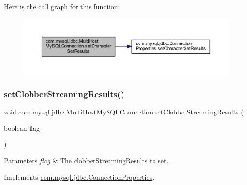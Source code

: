 Here is the call graph for this function\+:
\nopagebreak
\begin{figure}[H]
\begin{center}
\leavevmode
\includegraphics[width=350pt]{classcom_1_1mysql_1_1jdbc_1_1_multi_host_my_s_q_l_connection_a5fa2549fbd789689d65411226fc16101_cgraph}
\end{center}
\end{figure}
\mbox{\label{classcom_1_1mysql_1_1jdbc_1_1_multi_host_my_s_q_l_connection_aaa5a94dd2c2c57150920af50503b9764}} 
\subsubsection{\texorpdfstring{set\+Clobber\+Streaming\+Results()}{setClobberStreamingResults()}}
{\footnotesize\ttfamily void com.\+mysql.\+jdbc.\+Multi\+Host\+My\+S\+Q\+L\+Connection.\+set\+Clobber\+Streaming\+Results (\begin{DoxyParamCaption}\item[{boolean}]{flag }\end{DoxyParamCaption})}


\begin{DoxyParams}{Parameters}
{\em flag} & The clobber\+Streaming\+Results to set. \\
\hline
\end{DoxyParams}


Implements \mbox{\hyperlink{interfacecom_1_1mysql_1_1jdbc_1_1_connection_properties_a3bb976fbcde1b60e4dae84b49320de5f}{com.\+mysql.\+jdbc.\+Connection\+Properties}}.

